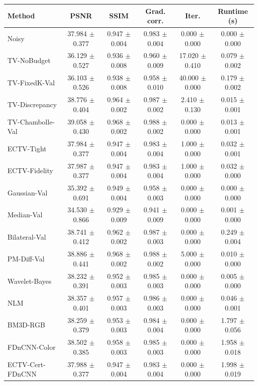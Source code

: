 \begin{tabular}{lccccc}
\toprule
Method & PSNR & SSIM & Grad. corr. & Iter. & Runtime (s) \\
\midrule
Noisy & 37.984 $\pm$ 0.377 & 0.947 $\pm$ 0.004 & 0.983 $\pm$ 0.004 & 0.000 $\pm$ 0.000 & 0.000 $\pm$ 0.000 \\
TV-NoBudget & 36.129 $\pm$ 0.527 & 0.936 $\pm$ 0.008 & 0.960 $\pm$ 0.009 & 17.020 $\pm$ 0.410 & 0.079 $\pm$ 0.002 \\
TV-FixedK-Val & 36.103 $\pm$ 0.526 & 0.938 $\pm$ 0.008 & 0.958 $\pm$ 0.010 & 40.000 $\pm$ 0.000 & 0.179 $\pm$ 0.002 \\
TV-Discrepancy & 38.776 $\pm$ 0.404 & 0.964 $\pm$ 0.002 & 0.987 $\pm$ 0.002 & 2.410 $\pm$ 0.130 & 0.015 $\pm$ 0.001 \\
TV-Chambolle-Val & 39.058 $\pm$ 0.430 & 0.968 $\pm$ 0.002 & 0.988 $\pm$ 0.002 & 0.000 $\pm$ 0.000 & 0.013 $\pm$ 0.001 \\
ECTV-Tight & 37.984 $\pm$ 0.377 & 0.947 $\pm$ 0.004 & 0.983 $\pm$ 0.004 & 1.000 $\pm$ 0.000 & 0.032 $\pm$ 0.001 \\
ECTV-Fidelity & 37.987 $\pm$ 0.377 & 0.947 $\pm$ 0.004 & 0.983 $\pm$ 0.004 & 1.000 $\pm$ 0.000 & 0.032 $\pm$ 0.000 \\
Gaussian-Val & 35.392 $\pm$ 0.691 & 0.949 $\pm$ 0.004 & 0.958 $\pm$ 0.003 & 0.000 $\pm$ 0.000 & 0.000 $\pm$ 0.000 \\
Median-Val & 34.530 $\pm$ 0.866 & 0.929 $\pm$ 0.009 & 0.941 $\pm$ 0.009 & 0.000 $\pm$ 0.000 & 0.001 $\pm$ 0.000 \\
Bilateral-Val & 38.741 $\pm$ 0.412 & 0.962 $\pm$ 0.002 & 0.987 $\pm$ 0.003 & 0.000 $\pm$ 0.000 & 0.249 $\pm$ 0.004 \\
PM-Diff-Val & 38.886 $\pm$ 0.441 & 0.968 $\pm$ 0.002 & 0.988 $\pm$ 0.002 & 5.000 $\pm$ 0.000 & 0.010 $\pm$ 0.000 \\
Wavelet-Bayes & 38.232 $\pm$ 0.391 & 0.952 $\pm$ 0.003 & 0.985 $\pm$ 0.003 & 0.000 $\pm$ 0.000 & 0.005 $\pm$ 0.000 \\
NLM & 38.357 $\pm$ 0.401 & 0.957 $\pm$ 0.003 & 0.986 $\pm$ 0.003 & 0.000 $\pm$ 0.000 & 0.046 $\pm$ 0.001 \\
BM3D-RGB & 38.259 $\pm$ 0.379 & 0.953 $\pm$ 0.003 & 0.984 $\pm$ 0.004 & 0.000 $\pm$ 0.000 & 1.797 $\pm$ 0.056 \\
FDnCNN-Color & 38.502 $\pm$ 0.385 & 0.958 $\pm$ 0.003 & 0.985 $\pm$ 0.003 & 0.000 $\pm$ 0.000 & 1.958 $\pm$ 0.018 \\
ECTV-Cert-FDnCNN & 37.988 $\pm$ 0.377 & 0.947 $\pm$ 0.004 & 0.983 $\pm$ 0.004 & 0.000 $\pm$ 0.000 & 1.998 $\pm$ 0.019 \\
\bottomrule
\end{tabular}
